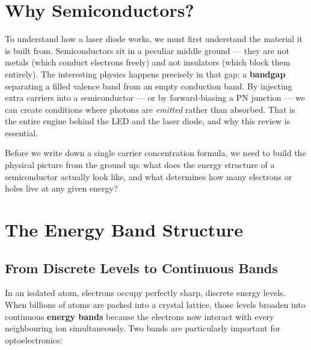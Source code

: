 
\section{Why Semiconductors?}

To understand how a laser diode works, we must first understand the material it is built from. Semiconductors sit in a peculiar middle ground — they are not metals (which conduct electrons freely) and not insulators (which block them entirely). The interesting physics happens precisely in that gap: a \textbf{bandgap} separating a filled valence band from an empty conduction band. By injecting extra carriers into a semiconductor — or by forward-biasing a PN junction — we can create conditions where photons are \emph{emitted} rather than absorbed. That is the entire engine behind the LED and the laser diode, and why this review is essential.

Before we write down a single carrier concentration formula, we need to build the physical picture from the ground up: what does the energy structure of a semiconductor actually look like, and what determines how many electrons or holes live at any given energy?

\section{The Energy Band Structure}

\subsection{From Discrete Levels to Continuous Bands}

In an isolated atom, electrons occupy perfectly sharp, discrete energy levels. When billions of atoms are packed into a crystal lattice, those levels broaden into continuous \textbf{energy bands} because the electrons now interact with every neighbouring ion simultaneously. Two bands are particularly important for optoelectronics:

